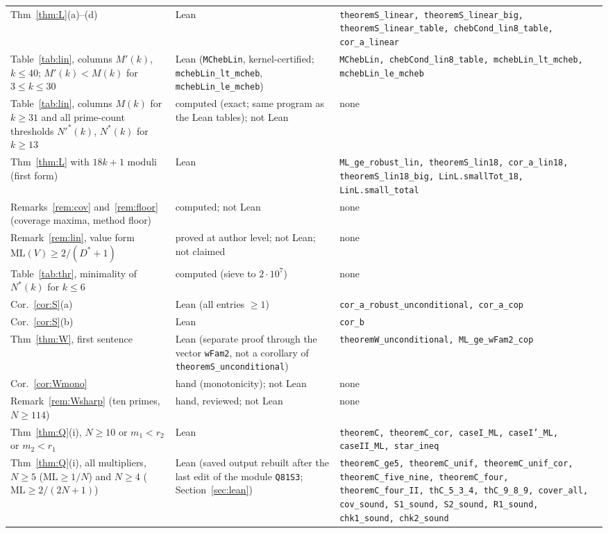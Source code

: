 \documentclass[11pt]{article}
\theoremstyle{definition}
\theoremstyle{remark}
\newcommand{\ML}{\mathrm{ML}}
\begin{document}
{\begin{longtable}{@{}p{}p{}p{}@{}}
Thm~\ref{thm:L}(a)--(d) & Lean & \texttt{theoremS\_linear, theoremS\_linear\_big, theoremS\_linear\_table, chebCond\_lin8\_table, cor\_a\_linear} \\
Table~\ref{tab:lin}, columns $M'(k)$, $k\le40$; $M'(k)<M(k)$ for $3\le k\le30$ & Lean (\texttt{MChebLin}, kernel-certified; \texttt{mchebLin\_lt\_mcheb}, \texttt{mchebLin\_le\_mcheb}) & \texttt{MChebLin, chebCond\_lin8\_table, mchebLin\_lt\_mcheb, mchebLin\_le\_mcheb} \\
Table~\ref{tab:lin}, columns $M(k)$ for $k\ge31$ and all prime-count thresholds $N'^*(k)$, $N^*(k)$ for $k\ge13$ & computed (exact; same program as the Lean tables); not Lean & none \\
Thm~\ref{thm:L} with $18k+1$ moduli (first form) & Lean & \texttt{ML\_ge\_robust\_lin, theoremS\_lin18, cor\_a\_lin18, theoremS\_lin18\_big, LinL.smallTot\_18, LinL.small\_total} \\
Remarks~\ref{rem:cov} and~\ref{rem:floor} (coverage maxima, method floor) & computed; not Lean & none \\
Remark~\ref{rem:lin}, value form $\ML(V)\ge2/(D^*+1)$ & proved at author level; not Lean; not claimed & none \\
Table~\ref{tab:thr}, minimality of $N^*(k)$ for $k\le6$ & computed (sieve to $2\cdot10^7$) & none \\
Cor.~\ref{cor:S}(a) & Lean (all entries $\ge1$) & \texttt{cor\_a\_robust\_unconditional, cor\_a\_cop} \\
Cor.~\ref{cor:S}(b) & Lean & \texttt{cor\_b} \\
Thm~\ref{thm:W}, first sentence & Lean (separate proof through the vector \texttt{wFam2}, not a corollary of \texttt{theoremS\_unconditional}) & \texttt{theoremW\_unconditional, ML\_ge\_wFam2\_cop} \\
Cor.~\ref{cor:Wmono} & hand (monotonicity); not Lean & none \\
Remark~\ref{rem:Wsharp} (ten primes, $N\ge114$) & hand, reviewed; not Lean & none \\
Thm~\ref{thm:Q}(i), $N\ge10$ or $m_1<r_2$ or $m_2<r_1$ & Lean & \texttt{theoremC, theoremC\_cor, caseI\_ML, caseI'\_ML, caseII\_ML, star\_ineq} \\
Thm~\ref{thm:Q}(i), all multipliers, $N\ge5$ ($\ML\ge1/N$) and $N\ge4$ ($\ML\ge2/(2N+1)$) & Lean (saved output rebuilt after the last edit of the module \texttt{Q81S3}; Section~\ref{sec:lean}) & \texttt{theoremC\_ge5, theoremC\_unif, theoremC\_unif\_cor, theoremC\_five\_nine, theoremC\_four, theoremC\_four\_II, thC\_5\_3\_4, thC\_9\_8\_9, cover\_all, cov\_sound, S1\_sound, S2\_sound, R1\_sound, chk1\_sound, chk2\_sound} \\

\end{longtable}}
\end{document}
